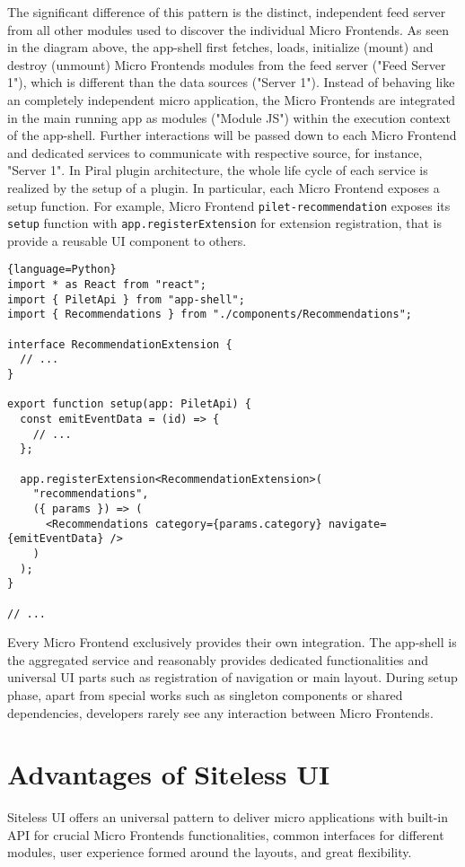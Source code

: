 \documentclass[a4paper]{book}
\begin{document}
The significant difference of this pattern is the distinct, independent feed server from all other modules used to discover the individual Micro Frontends. As seen in the diagram above, the app-shell first fetches, loads, initialize (mount) and destroy (unmount) Micro Frontends modules from the feed server ("Feed Server 1"), which is different than the data sources ("Server 1"). Instead of behaving like an completely independent micro application, the Micro Frontends are integrated in the main running app as modules ("Module JS") within the execution context of the app-shell. Further interactions will be passed down to each Micro Frontend and dedicated services to communicate with respective source, for instance, "Server 1". In Piral plugin architecture, the whole life cycle of each service is realized by the setup of a plugin. In particular, each Micro Frontend exposes a setup function. For example, Micro Frontend \verb|pilet-recommendation| exposes its \verb|setup| function with \verb|app.registerExtension| for extension registration, that is provide a reusable UI component to others. \cite{Rap20}
\begin{lstlisting}{language=Python}
import * as React from "react";
import { PiletApi } from "app-shell";
import { Recommendations } from "./components/Recommendations";

interface RecommendationExtension {
  // ...
}

export function setup(app: PiletApi) {
  const emitEventData = (id) => {
    // ...
  };

  app.registerExtension<RecommendationExtension>(
    "recommendations",
    ({ params }) => (
      <Recommendations category={params.category} navigate={emitEventData} />
    )
  );
}

// ...
\end{lstlisting}
Every Micro Frontend exclusively provides their own integration. The app-shell is the aggregated service and reasonably provides dedicated functionalities and universal UI parts such as registration of navigation or main layout. During setup phase, apart from special works such as singleton components or shared dependencies, developers rarely see any interaction between Micro Frontends.
\section{Advantages  of Siteless UI}
Siteless UI offers an universal pattern to deliver micro applications with built-in API for crucial Micro Frontends functionalities, common interfaces for different modules, user experience formed around the layouts, and great flexibility.
\end{document}
